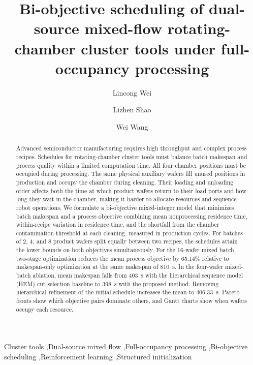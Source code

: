 \documentclass[final,5p,times,twocolumn]{elsarticle}
\begin{document}
\raggedbottom
\begin{frontmatter}
\title{Bi-objective scheduling of dual-source mixed-flow rotating-chamber cluster tools under full-occupancy processing}
\author[ustb]{Lincong Wei}
\author[ustb]{Lizhen Shao}
\author[ustb]{Wei Wang}
\address[ustb]{Department of Control Science and Engineering, University of Science and Technology Beijing, No. 30 Xueyuan Road, Haidian District, Beijing 100083, China}
\begin{abstract}
Advanced semiconductor manufacturing requires high throughput and complex process recipes. Schedules for rotating-chamber cluster tools must balance batch makespan and process quality within a limited computation time. All four chamber positions must be occupied during processing. The same physical auxiliary wafers fill unused positions in production and occupy the chamber during cleaning. Their loading and unloading order affects both the time at which product wafers return to their load ports and how long they wait in the chamber, making it harder to allocate resources and sequence robot operations. We formulate a bi-objective mixed-integer model that minimizes batch makespan and a process objective combining mean nonprocessing residence time, within-recipe variation in residence time, and the shortfall from the chamber contamination threshold at each cleaning, measured in production cycles. For batches of 2, 4, and 8 product wafers split equally between two recipes, the schedules attain the lower bounds on both objectives simultaneously. For the 16-wafer mixed batch, two-stage optimization reduces the mean process objective by 65.14\% relative to makespan-only optimization at the same makespan of 810~s. In the four-wafer mixed-batch ablation, mean makespan falls from 403~s with the hierarchical sequence model (HEM) cut-selection baseline to 398~s with the proposed method. Removing hierarchical refinement of the initial schedule increases the mean to 406.33~s. Pareto fronts show which objective pairs dominate others, and Gantt charts show when wafers occupy each resource.
\end{abstract}
\begin{keyword}
Cluster tools \sep Dual-source mixed flow \sep Full-occupancy processing \sep Bi-objective scheduling \sep Reinforcement learning \sep Structured initialization
\end{keyword}
\end{frontmatter}
\end{document}
